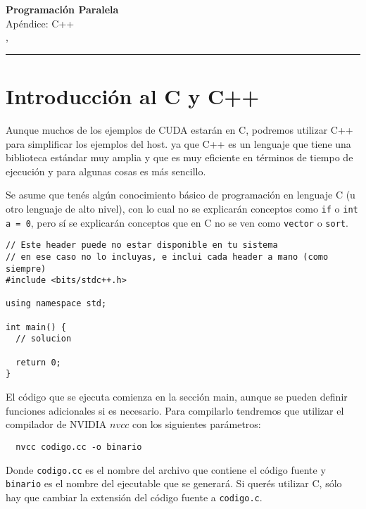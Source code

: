 



\begin{center}
    \LARGE\textbf{Programación Paralela} \\
    \Large{Apéndice: C++} \\
    \normalsize{\currentsemester, \currentyear} \\
    \vspace{1em}
    \hrule
\end{center}

\section{Introducción al C y C++}

Aunque muchos de los ejemplos de CUDA estarán en C, podremos utilizar C++ para simplificar los ejemplos del host. ya que
C++ es un lenguaje que tiene una biblioteca estándar muy amplia y que es muy eficiente en términos de tiempo de
ejecución y para algunas cosas es más sencillo.

Se asume que tenés algún conocimiento básico de programación en lenguaje C (u otro lenguaje de alto nivel), con lo cual
no se explicarán conceptos como \texttt{if} o \texttt{int a = 0}, pero sí se explicarán conceptos que en C no se ven
como \texttt{vector} o \texttt{sort}.

\begin{lstlisting}
// Este header puede no estar disponible en tu sistema
// en ese caso no lo incluyas, e inclui cada header a mano (como siempre)
#include <bits/stdc++.h>

using namespace std;

int main() {
  // solucion

  return 0;
}
\end{lstlisting}

El código que se ejecuta comienza en la sección main, aunque se pueden definir funciones adicionales si es necesario.
Para compilarlo tendremos que utilizar el compilador de NVIDIA $nvcc$ con los siguientes parámetros:

\begin{lstlisting}
  nvcc codigo.cc -o binario
\end{lstlisting}

Donde \texttt{codigo.cc} es el nombre del archivo que contiene el código fuente y \texttt{binario} es el nombre
del ejecutable que se generará. Si querés utilizar C, sólo hay que cambiar la extensión del código fuente a
\texttt{codigo.c}.

